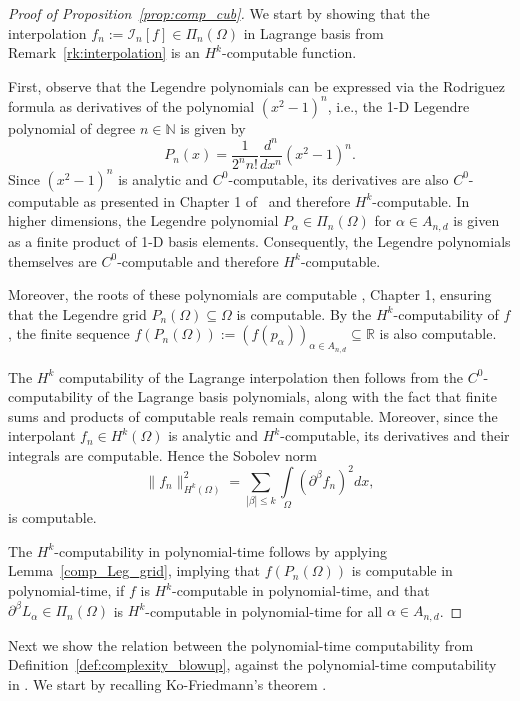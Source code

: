 \documentclass[pdflatex]{sn-jnl}%
\begin{document}
\vspace{-1em}\begin{proof}[Proof of Proposition~\ref{prop:comp_cub}]
We start by showing that the interpolation $f_n:=\mathcal{I}_n[f] \in \Pi_n(\Omega)$ in Lagrange basis from Remark~\ref{rk:interpolation} is an $H^k$-computable function.

First, observe that the Legendre polynomials can be expressed via the Rodriguez formula \cite{Arfken2013-ny} as derivatives of the polynomial $(x^2 - 1)^n$, i.e., the 1-D Legendre polynomial of degree $n\in \mathbb{N}$ is given by
$$
P_n(x) = \frac{1}{2^n n!} \frac{d^n}{dx^n} (x^2 - 1)^n.
$$
Since $(x^2 - 1)^n$ is analytic and $C^0$-computable, its derivatives are also $C^0$-computable as presented in Chapter 1 of~\cite{Pour-El1989-yg} and therefore $H^k$-computable. In higher dimensions, the Legendre polynomial $P_\alpha\in\Pi_n(\Omega)$ for $\alpha\in A_{n,d}$ is given as a finite product of 1-D basis elements. Consequently, the Legendre polynomials themselves are $C^0$-computable and therefore $H^k$-computable.

Moreover, the roots of these polynomials are computable \cite{Pour-El1989-yg}, Chapter 1, ensuring that the Legendre grid $P_{n}(\Omega) \subseteq \Omega$ is computable. By the $H^k$-computability of $f$, the finite sequence $f(P_{n}(\Omega)):=(f(p_\alpha))_{\alpha\in A_{n,d}} \subseteq \mathbb{R}$ is also computable.

The $H^k$ computability of the Lagrange interpolation then follows from the $C^0$-computability of the Lagrange basis polynomials, along with the fact that finite sums and products of computable reals remain computable. Moreover, since the interpolant $f_n \in H^k(\Omega)$ is analytic and $H^k$-computable, its derivatives and their integrals are computable. Hence the Sobolev norm
\begin{equation}
    \|f_n\|_{H^k(\Omega)}^2 = \sum\limits_{|\beta|\leq k}\int\limits_{\Omega}(\partial^\beta f_n)^2dx,
\end{equation}
is computable.

The $H^k$-computability in polynomial-time follows by applying Lemma~\ref{comp_Leg_grid}, implying that $f(P_{n}(\Omega))$ is computable in polynomial-time, if $f$ is  $H^k$-computable in polynomial-time, and that $\partial^\beta L_\alpha\in \Pi_{n}(\Omega)$ is $H^k$-computable in polynomial-time for all $\alpha\in A_{n,d}$.
\end{proof}
Next we show the relation between the polynomial-time computability from Definition~\ref{def:complexity_blowup}, against the polynomial-time computability in \cite{Steinberg2017}. We start by recalling Ko-Friedmann's theorem \cite{Steinberg2017}. 
\end{document}
